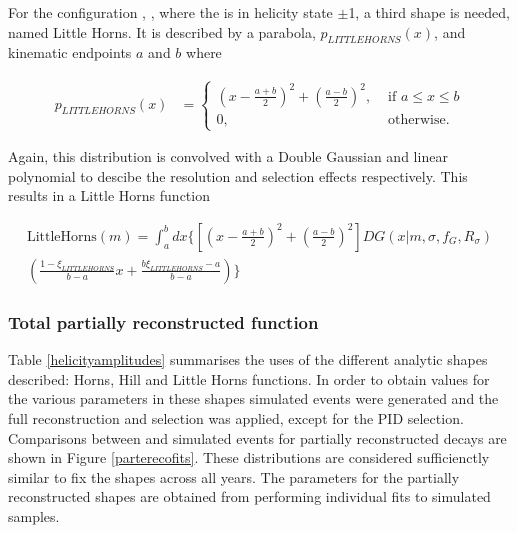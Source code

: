 For the configuration \decay{\Bm}{\Dstarz\Kstarm}, \decay{\Dstarz}{\Dz\gamma}, where the \Dstarz is in helicity state $\pm$1, a third shape is needed, named Little Horns. It is described by a parabola, $p_{LITTLEHORNS}(x)$, and kinematic endpoints $a$ and $b$ where

\begin{align}
p_{LITTLEHORNS}(x) &= \begin{cases}
\left(x - \frac{a+b}{2}\right)^2 + \left(\frac{a-b}{2}\right)^2, & \text{ if $a \leq x \leq b$}\\ 	
0, & \text{ otherwise.}
\end{cases} 
\end{align}

Again, this distribution is convolved with a Double Gaussian and linear polynomial to descibe the resolution and selection effects respectively. This results in a Little Horns function

\begin{multline}
\text{LittleHorns}(m) = \int_a^b dx \biggl\{ \left[ \left( x - \frac{a+b}{2} \right) ^2 + \left( \frac{a-b}{2} \right) ^2 \right] DG(x|m,\sigma,f_G,R_{\sigma}) \\
\left( \frac{1 - \xi_{LITTLEHORNS}}{b - a}x + \frac{b\xi_{LITTLEHORNS} - a}{b - a} \right) \biggr\}
\label{eqn:littlehorns}
\end{multline}

\subsubsection{Total partially reconstructed function}

Table \ref{helicityamplitudes} summarises the uses of the different analytic shapes described: Horns, Hill and Little Horns functions. In order to obtain values for the various parameters in these shapes simulated events were generated and the full reconstruction and selection was applied, except for the PID selection. Comparisons between \runone and \runtwo simulated events for partially reconstructed decays are shown in Figure \ref{parterecofits}. These distributions are considered sufficienctly similar to fix the shapes across all years. The parameters for the partially reconstructed shapes are obtained from performing individual fits to \runone simulated samples.

